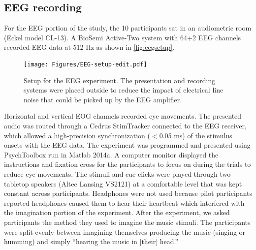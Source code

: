 \subsection{EEG recording}
For the EEG portion of the study, the 10 participants sat in an audiometric room (Eckel model CL-13). 
A BioSemi Active-Two system with 64+2 EEG channels recorded EEG data at 512 Hz as shown in \autoref{fig:eegsetup}.
\begin{figure}[htb]
  \begin{center}
    \texttt{[image: Figures/EEG-setup-edit.pdf]}
    \caption{%
Setup for the EEG experiment.
The presentation and recording systems were placed outside to reduce the impact of electrical line noise that could be picked up by the EEG amplifier.
}
    \label{fig:eegsetup}
  \end{center}
\end{figure}
Horizontal and vertical EOG channels recorded eye movements. 
The presented audio %
was routed through a Cedrus StimTracker connected to the EEG receiver, which allowed a high-precision synchronization ($<$0.05 ms) of the stimulus onsets with the \ac{EEG} data.
The experiment was programmed and presented using PsychToolbox run in Matlab 2014a. 
A computer monitor displayed the instructions and fixation cross for the participants to focus on during the trials to reduce eye movements.
The stimuli and cue clicks were played through two tabletop speakers (Altec Lansing VS2121) at a comfortable level that was kept constant across participants. 
Headphones were not used because pilot participants reported headphones caused them to hear their heartbeat which interfered with the imagination portion of the experiment. 
After the experiment, we asked participants the method they used to imagine the music stimuli.
The participants were split evenly between imagining themselves producing the music (singing or humming) and simply ``hearing the music in [their] head.'' 

